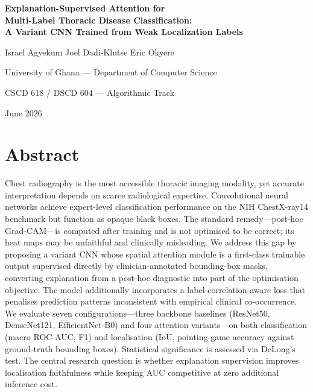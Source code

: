 \documentclass[12pt, a4paper]{article}
\begin{document}
\begin{titlepage}
  \centering
  \vspace*{2cm}
  {\LARGE\bfseries Explanation-Supervised Attention for\\[0.3em]
   Multi-Label Thoracic Disease Classification:\\[0.3em]
   A Variant CNN Trained from Weak Localization Labels\par}
  \vspace{1.5cm}
  {\large Israel Agyekum \quad Joel Dadi-Klutse \quad Eric Okyere\par}
  \vspace{0.4cm}
  {\normalsize University of Ghana --- Department of Computer Science\par}
  {\normalsize CSCD 618 / DSCD 604 --- Algorithmic Track\par}
  \vspace{0.4cm}
  {\normalsize June 2026\par}
  \vfill
\end{titlepage}

\section*{Abstract}

Chest radiography is the most accessible thoracic imaging modality, yet accurate
interpretation depends on scarce radiological expertise. Convolutional neural networks
achieve expert-level classification performance on the NIH ChestX-ray14 benchmark but
function as opaque black boxes. The standard remedy---post-hoc Grad-CAM---is computed
after training and is not optimised to be correct; its heat maps may be unfaithful and
clinically misleading. We address this gap by proposing a variant CNN whose spatial
attention module is a first-class trainable output supervised directly by
clinician-annotated bounding-box masks, converting explanation from a post-hoc
diagnostic into part of the optimisation objective. The model additionally incorporates
a label-correlation-aware loss that penalises prediction patterns inconsistent with
empirical clinical co-occurrence. We evaluate seven configurations---three backbone
baselines (ResNet50, DenseNet121, EfficientNet-B0) and four attention variants---on both
classification (macro ROC-AUC, F1) and localisation (IoU, pointing-game accuracy against
ground-truth bounding boxes). Statistical significance is assessed via DeLong's test. The
central research question is whether explanation supervision improves localisation
faithfulness while keeping AUC competitive at zero additional inference cost.
\end{document}
